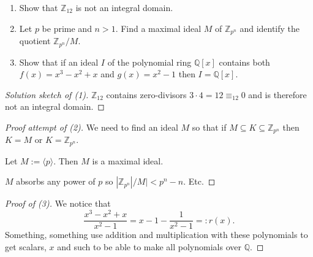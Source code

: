 \begin{prob}
    \medskip 
    \noindent 
    \begin{enumerate}
        \item Show that $\mathbb Z_{12}$ is not an integral domain. 
        \item Let $p$ be prime and $n > 1$. Find a maximal ideal 
            $M$ of $\mathbb Z_{p^n}$ and identify the 
            quotient $\mathbb Z_{p^n} / M$. 
        \item Show that if an ideal $I$ of the polynomial ring 
            $\mathbb Q[x]$ contains both $f(x) = x^3 - x^2 + x$ 
            and $g(x) = x^2 - 1$ then $I = \mathbb Q[x]$.
    \end{enumerate}
\end{prob}
\begin{proof}[Solution sketch of (1)]
    $\mathbb Z_{12}$ contains zero-divisors 
    $3 \cdot 4 = 12 \equiv_{12} 0$ and is therefore not an 
    integral domain.
\end{proof}
\begin{proof}[Proof attempt of (2)]
    We need to find an ideal $M$ so that 
    if $M \subseteq K \subseteq \mathbb Z_{p^n}$ then 
    $K = M$ or $K = \mathbb Z_{p^n}$.

    Let $M := \langle p \rangle$. Then $M$ is a maximal ideal.  

    $M$ absorbs any power of $p$ so $|\mathbb Z_{p^n}|/M| < p^n - 
    n$. Etc.   
\end{proof}
\begin{proof}[Proof of (3)]
    We notice that 
    \[
        \frac{x^3 - x^2 + x}{x^2 - 1} 
        = x - 1 - \frac{1}{x^2 - 1} =: r(x).
    \]
    Something, something use addition and multiplication with 
    these polynomials to get scalars, $x$ and such to be able 
    to make all polynomials over $\mathbb Q$.
\end{proof}

